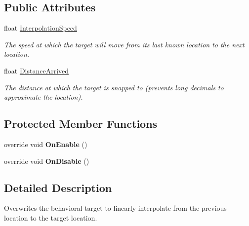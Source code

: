 \subsection*{Public Attributes}
\begin{DoxyCompactItemize}
\item 
float \hyperlink{class_skyrates_1_1_a_i_1_1_decorator_1_1_smooth_target_a4d83be120553c3b0d42b6cf78d28386d}{Interpolation\-Speed}
\begin{DoxyCompactList}\small\item\em The speed at which the target will move from its last known location to the next location. \end{DoxyCompactList}\item 
float \hyperlink{class_skyrates_1_1_a_i_1_1_decorator_1_1_smooth_target_a48d78b71d13d4bdbb8ed967d30e26242}{Distance\-Arrived}
\begin{DoxyCompactList}\small\item\em The distance at which the target is snapped to (prevents long decimals to approximate the location). \end{DoxyCompactList}\end{DoxyCompactItemize}
\subsection*{Protected Member Functions}
\begin{DoxyCompactItemize}
\item 
\hypertarget{class_skyrates_1_1_a_i_1_1_decorator_1_1_smooth_target_adc10e090c813636e9c0c169333424e4d}{override void {\bfseries On\-Enable} ()}\label{class_skyrates_1_1_a_i_1_1_decorator_1_1_smooth_target_adc10e090c813636e9c0c169333424e4d}

\item 
\hypertarget{class_skyrates_1_1_a_i_1_1_decorator_1_1_smooth_target_a48e2ee1629c8c6dba0c8e56739f624d6}{override void {\bfseries On\-Disable} ()}\label{class_skyrates_1_1_a_i_1_1_decorator_1_1_smooth_target_a48e2ee1629c8c6dba0c8e56739f624d6}

\end{DoxyCompactItemize}


\subsection{Detailed Description}
Overwrites the behavioral target to linearly interpolate from the previous location to the target location. 



